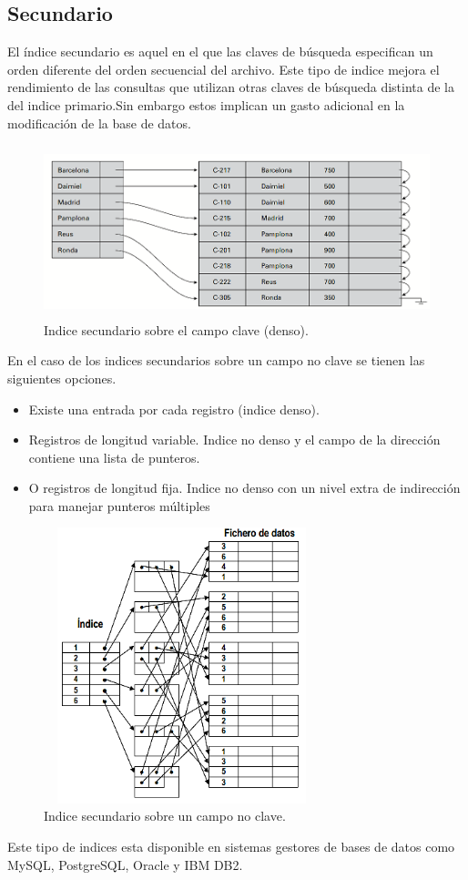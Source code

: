 \documentclass[12pt, titlepage]{article}
\begin{document}
	\subsection{Secundario}
	El índice secundario es aquel en el que las claves de búsqueda especifican un orden diferente del orden secuencial del archivo.
	Este tipo de indice mejora el rendimiento de las consultas que utilizan otras claves de búsqueda distinta de la del indice primario.Sin embargo estos implican un gasto adicional en la modificación de la base de datos.
	\begin{figure}[H]
		\begin{center}
			\includegraphics[width=14cm, height=5cm]{img/secundario.png}
			\caption{Indice secundario sobre el campo clave (denso).}
			\label{fig:hasta-use}
		\end{center}
	\end{figure}
En el caso de los indices secundarios sobre un campo no clave se tienen las siguientes opciones.
\begin{itemize}
	\item Existe una entrada por cada registro (indice denso).
	\item Registros de longitud variable. Indice no denso y el campo de la dirección contiene una lista de punteros.
	\item O registros de longitud fija. Indice no denso con un nivel extra de indirección para manejar punteros múltiples
\end{itemize}
	\begin{figure}[H]
	\begin{center}
		\includegraphics[width=8cm, height=8cm]{img/secundario2.png}
		\caption{Indice secundario sobre un campo no clave.}
		\label{fig:use}
	\end{center}
	\end{figure}
Este tipo de indices esta disponible en sistemas gestores de bases de datos como MySQL, PostgreSQL, Oracle y IBM DB2.
\end{document}
